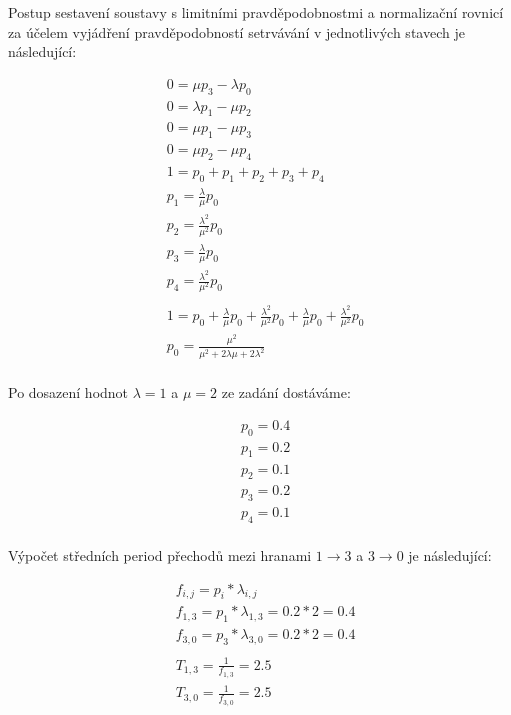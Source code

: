\documentclass[12pt, a4paper]{article}
\begin{document}
Postup sestavení soustavy s limitními pravděpodobnostmi a normalizační rovnicí za účelem vyjádření pravděpodobností setrvávání v jednotlivých stavech je následující:

\begin{equation}
    \begin{split}
    & 0 = \mu p_{3} - \lambda p_{0} \\
    & 0 = \lambda p_{1} - \mu p_{2} \\
    & 0 = \mu p_{1} - \mu p_{3} \\
    & 0 = \mu p_{2} - \mu p_{4} \\
    & 1 = p_{0} + p_{1} + p_{2} + p_{3} + p_{4}
    \\
    & p_{1} = \frac{\lambda}{\mu} p_0 \\
    & p_{2} = \frac{\lambda^2}{\mu^2} p_0 \\
    & p_{3} = \frac{\lambda}{\mu} p_0 \\
    & p_{4} = \frac{\lambda^2}{\mu^2} p_0 \\
    \\
    & 1 = p_{0} + \frac{\lambda}{\mu} p_0 + \frac{\lambda^2}{\mu^2} p_0 + \frac{\lambda}{\mu} p_0 + \frac{\lambda^2}{\mu^2} p_0 \\
    & p_{0} = \frac{\mu^2}{\mu^2 + 2\lambda\mu + 2\lambda^2} \\
    \end{split}
\end{equation}

\pagebreak
\noindent Po dosazení hodnot $\lambda=1$ a $\mu=2$ ze zadání dostáváme:

\begin{equation}
    \begin{split}
    & p_{0} = 0.4 \\
    & p_{1} = 0.2 \\
    & p_{2} = 0.1 \\
    & p_{3} = 0.2 \\
    & p_{4} = 0.1 \\
    \end{split}
\end{equation}

Výpočet středních period přechodů mezi hranami $1 \rightarrow 3$ a $3 \rightarrow 0$ je následující:

\begin{equation}
    \begin{split}
    & f_{i, j} = p_{i} * \lambda_{i, j} \\
    & f_{1, 3} = p_{1} * \lambda_{1, 3} = 0.2 * 2 = 0.4 \\
    & f_{3, 0} = p_{3} * \lambda_{3, 0} = 0.2 * 2 = 0.4 \\
    & \\
    & T_{1, 3} = \frac{1}{f_{1, 3}} = 2.5 \\
    & T_{3, 0} = \frac{1}{f_{3, 0}} = 2.5 \\
    \end{split}
\end{equation}
\end{document}
